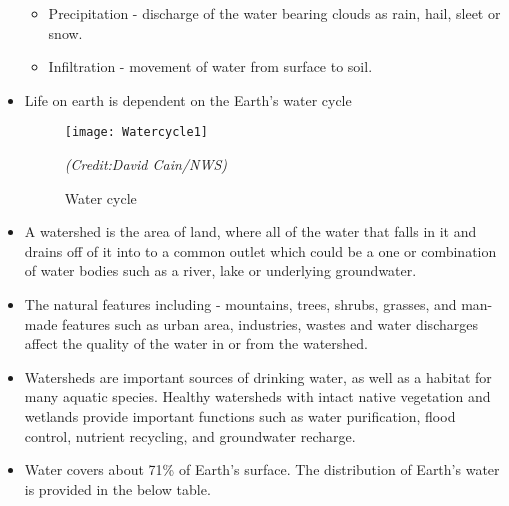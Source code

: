 \begin{itemize}
\begin{itemize}
\item Precipitation - discharge of the water bearing clouds as rain, hail, sleet or snow.
\item Infiltration - movement of water from surface to soil.
\end{itemize} 
\item Life on earth is dependent on the Earth's water cycle 
\begin{figure}[]
\begin{center}
\texttt{[image: Watercycle1]}
\caption{Water cycle}
\label{Water cycle}
\textit{(Credit:David Cain/NWS)}
\end{center}
\end{figure}
\item A watershed  is the area of land, where all of the water that falls in it and drains off of it into to a common outlet which could be a one or combination of water bodies such as a river, lake or underlying groundwater.
\item The natural features including - mountains, trees, shrubs, grasses, and man-made features such as urban area, industries, wastes and water discharges affect the quality of the water in or from the watershed.
\item Watersheds are important sources of drinking water, as well as a habitat for many aquatic species. Healthy watersheds with intact native vegetation and wetlands provide important functions such as water purification, flood control, nutrient recycling, and groundwater recharge.
\item Water covers about 71\% of Earth's surface.  The distribution of Earth's water  is provided in the below table.


\end{itemize}
